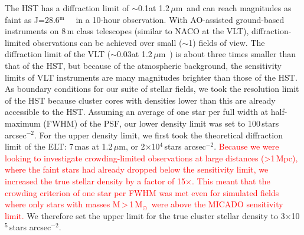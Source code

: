 \documentclass[referee]{aa}
\newcommand{\m}{$^\mathrm{m}$~}
\newcommand{\um}{$\mu$m~}
\newcommand{\ume}{$\mu$m}
\newcommand{\msun}{M$_\odot$~}
\newcommand{\s}{$\sim$}
\newcommand{\h}[1]{$^{#1}$}
\newcommand{\spae}{stars arcsec$^{-2}$}
\newcommand{\langedit}[1]{\textcolor{red}{#1}}
\begin{document}
The HST has a diffraction limit of \s0.1\arcsec at 1.2\,\um and can reach magnitudes as faint as J=28.6\m~\citep{hst_wfc3} in a 10-hour observation.
With AO-assisted ground-based instruments on 8\,m class telescopes (similar to NACO at the VLT), diffraction-limited observations can be achieved over small (\s1\arcmin) fields of view.
The diffraction limit of the VLT (\s0.03\arcsec at 1.2\,\um) is about three times smaller than that of the HST, but because of the atmospheric background, the sensitivity limits of VLT instruments are many magnitudes brighter than those of the HST\@.
As boundary conditions for our suite of stellar fields, we took the resolution limit of the HST because cluster cores with densities lower than this are already accessible to the HST\@.
Assuming an average of one star per full width at half-maximum (FWHM) of the PSF, our lower density limit was set to 100\,\spae.
For the upper density limit, we first took the theoretical diffraction limit of the ELT: 7\,mas at 1.2\,\ume, or 2$\times$10\h4\,\spae.
\langedit{Because we were looking to investigate crowding-limited observations at large distances (\textgreater1\,Mpc), where the faint stars had already dropped below the sensitivity limit, we increased the true stellar density by a factor of 15$\times$.
This meant that the crowding criterion of one star per FWHM was met even for simulated fields where only stars with masses M\,\textgreater\,1\,\msun were above the MICADO sensitivity limit.}
We therefore set the upper limit for the true cluster stellar density to 3$\times$10\h5\,\spae.
\end{document}
